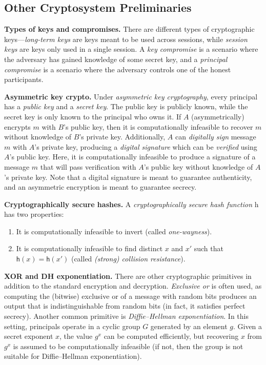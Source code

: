\documentclass{article}
\theoremstyle{definition}
\begin{document}
 \subsection{Other Cryptosystem Preliminaries}
 \textbf{Types of keys and compromises.} 
 There are different types of cryptographic keys---\emph{long-term keys} are keys meant to be used across sessions, 
 while \emph{session keys} are keys only used in a single session. 
 A \emph{key compromise} is a scenario where the adversary has gained knowledge of some secret key, 
 and a \emph{principal compromise} is a scenario where the adversary controls one of the honest participants.
 

\textbf{Asymmetric key crypto.} Under \emph{asymmetric key cryptography}, 
every principal has a \textit{public key} and a \textit{secret key}. 
The public key is publicly known, 
while the secret key is only known to the principal who owns it. 
If $A$ (asymmetrically) encrypts $m$ with $B$'s public key, 
then it is computationally infeasible to recover $m$ without knowledge of $B$'s private key. 
Additionally, $A$ can \emph{digitally sign} message $m$ with $A$'s private key, 
producing a \emph{digital signature} which can be \emph{verified} using $A$'s public key. 
Here, it is computationally infeasible to produce a signature of a message $m$ 
that will pass verification with $A$'s public key without knowledge of $A$'s private key.
 Note that a digital signature is meant to guarantee authenticity, and an asymmetric encryption is meant to guarantee secrecy.

\textbf{Cryptographically secure hashes.} A \textit{cryptographically secure hash function} \textsf{h} has two properties: 
\begin{enumerate}
\itemsep-.5em
\item It is computationally infeasible to invert (called \textit{one-wayness}). 
\item It is computationally infeasible to find distinct $x$ and $x'$ such that $\textsf{h}(x) = \textsf{h}(x')$ (called \textit{(strong) collision resistance}).
\end{enumerate}

\textbf{XOR and DH exponentiation.} 
There are other cryptographic primitives in addition to the standard encryption and decryption.
 \emph{Exclusive or} is often used, as computing the (bitwise) exclusive or of a message with random bits produces 
 an output that is indistinguishable from random bits (in fact, it satisfies perfect secrecy).
Another common primitive is \emph{Diffie--Hellman exponentiation}. 
In this setting, principals operate in a cyclic group $G$ generated by an element $g$. 
Given a secret exponent $x$, the value $g^x$ can be computed efficiently, 
but recovering $x$ from $g^x$ is assumed to be computationally infeasible 
(if not, then the group is not suitable for Diffie--Hellman exponentiation).
\end{document}
